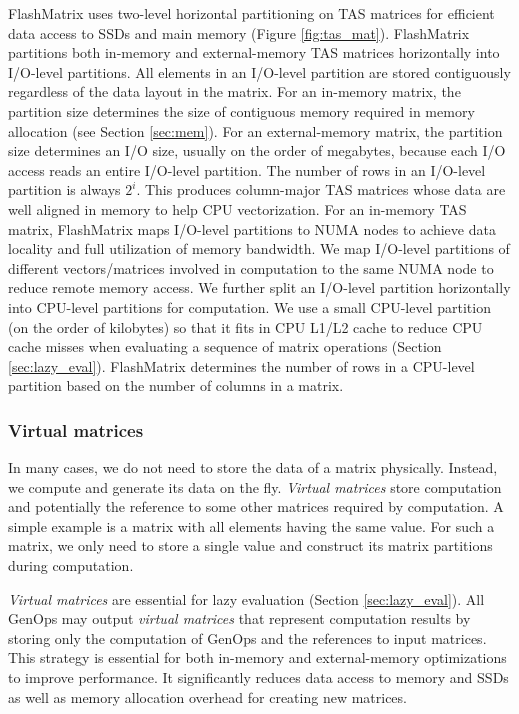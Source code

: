 FlashMatrix uses two-level horizontal partitioning on TAS matrices for
efficient data access to SSDs and main memory (Figure \ref{fig:tas_mat}).
FlashMatrix partitions both in-memory and
external-memory TAS matrices horizontally into I/O-level partitions.
All elements in an I/O-level partition are stored contiguously regardless
of the data layout in the matrix. For an in-memory matrix, the partition
size determines the size of contiguous memory required in memory allocation
(see Section \ref{sec:mem}). For an external-memory matrix, the partition
size determines an I/O size, usually on the order of megabytes, because each
I/O access reads an entire I/O-level partition. The number of rows in
an I/O-level partition is always $2^i$. This produces column-major TAS
matrices whose data are well aligned in memory to help CPU vectorization.
For an in-memory TAS matrix, FlashMatrix maps I/O-level partitions to NUMA
nodes to achieve data locality and full utilization of memory bandwidth.
We map I/O-level partitions of different vectors/matrices involved in
computation to the same NUMA node to reduce remote memory access.
We further split an I/O-level partition
horizontally into CPU-level partitions for computation. We use a small
CPU-level partition (on the order of kilobytes) so that it fits in CPU
L1/L2 cache to reduce CPU cache misses when evaluating a sequence of matrix
operations (Section \ref{sec:lazy_eval}). FlashMatrix determines the number
of rows in a CPU-level partition based on the number of columns in a matrix.

\subsubsection{Virtual matrices} \label{virt_mat}
In many cases, we do not need to store the data of a matrix physically. Instead,
we compute and generate its data on the fly. \textit{Virtual matrices} store
computation and potentially the reference
to some other matrices required by computation. A simple example is a matrix
with all elements having the same value. For such a matrix, we only need to store
a single value and construct its matrix partitions during computation.

\textit{Virtual matrices} are essential for lazy evaluation (Section
\ref{sec:lazy_eval}). All GenOps may output \textit{virtual matrices} that
represent computation results by storing only the computation of GenOps
and the references to input matrices. This strategy is
essential for both in-memory and external-memory optimizations to improve
performance. It significantly reduces data access to memory and SSDs as well as
memory allocation overhead for creating new matrices.

